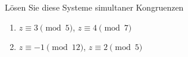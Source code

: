 \begin{aufgabe}
Lösen Sie diese Systeme simultaner Kongruenzen
\begin{enumerate}[label=\alph*)]
\item $z \equiv 3 \pmod{5}$, \quad $z \equiv 4 \pmod{7}$
\item $z \equiv -1 \pmod{12}$, \quad $z \equiv 2 \pmod{5}$
\end{enumerate}
\end{aufgabe}
